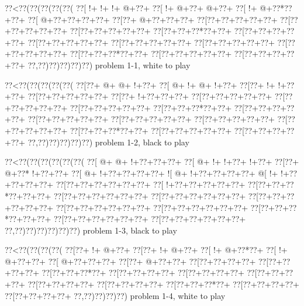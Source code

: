 \vbox{\vbox{\goo
\0??<\0??(\0??(\0??(\0??(\0??(
\0??[\- !+\- !+\- !+\- @+\0??+
\0??[\- !+\- @+\0??+\- @+\0??+
\0??[\- !+\- @+\0??*\0??+\0??+
\0??[\- @+\0??+\0??+\0??+\0??+
\0??[\0??+\- @+\0??+\0??+\0??+
\0??[\0??+\0??+\0??+\0??+\0??+
\0??[\0??+\0??+\0??+\0??+\0??+
\0??[\0??+\0??+\0??+\0??+\0??+
\0??[\0??+\0??+\0??*\0??+\0??+
\0??[\0??+\0??+\0??+\0??+\0??+
\0??[\0??+\0??+\0??+\0??+\0??+
\0??[\0??+\0??+\0??+\0??+\0??+
\0??[\0??+\0??+\0??+\0??+\0??+
\0??[\0??+\0??+\0??+\0??+\0??+
\0??[\0??+\0??+\0??*\0??+\0??+
\0??[\0??+\0??+\0??+\0??+\0??+
\0??[\0??+\0??+\0??+\0??+\0??+
\0??,\0??)\0??)\0??)\0??)\0??)
}
\hfil problem 1-1, white to play\hfil\break
}

\vbox{\vbox{\goo
\0??<\0??(\0??(\0??(\0??(\0??(
\0??[\0??+\- @+\- @+\- !+\0??+
\0??[\- @+\- !+\- @+\- !+\0??+
\0??[\0??+\- !+\- !+\0??+\0??+
\0??[\0??+\0??+\0??+\0??+\0??+
\0??[\0??+\- !+\0??+\0??+\0??+
\0??[\0??+\0??+\0??+\0??+\0??+
\0??[\0??+\0??+\0??+\0??+\0??+
\0??[\0??+\0??+\0??+\0??+\0??+
\0??[\0??+\0??+\0??*\0??+\0??+
\0??[\0??+\0??+\0??+\0??+\0??+
\0??[\0??+\0??+\0??+\0??+\0??+
\0??[\0??+\0??+\0??+\0??+\0??+
\0??[\0??+\0??+\0??+\0??+\0??+
\0??[\0??+\0??+\0??+\0??+\0??+
\0??[\0??+\0??+\0??*\0??+\0??+
\0??[\0??+\0??+\0??+\0??+\0??+
\0??[\0??+\0??+\0??+\0??+\0??+
\0??,\0??)\0??)\0??)\0??)\0??)
}
\hfil problem 1-2, black to play\hfil\break
}

\vbox{\vbox{\goo
\0??<\0??(\0??(\0??(\0??(\0??(\0??(
\0??[\- @+\- @+\- !+\0??+\0??+\0??+
\0??[\- @+\- !+\- !+\0??+\- !+\0??+
\0??[\0??+\- @+\0??*\- !+\0??+\0??+
\0??[\- @+\- !+\0??+\0??+\0??+\0??+
\- ![\- @+\- !+\0??+\0??+\0??+\0??+
\- @[\- !+\- !+\0??+\0??+\0??+\0??+
\0??[\0??+\0??+\0??+\0??+\0??+\0??+
\0??[\- !+\0??+\0??+\0??+\0??+\0??+
\0??[\0??+\0??+\0??*\0??+\0??+\0??+
\0??[\0??+\0??+\0??+\0??+\0??+\0??+
\0??[\0??+\0??+\0??+\0??+\0??+\0??+
\0??[\0??+\0??+\0??+\0??+\0??+\0??+
\0??[\0??+\0??+\0??+\0??+\0??+\0??+
\0??[\0??+\0??+\0??+\0??+\0??+\0??+
\0??[\0??+\0??+\0??*\0??+\0??+\0??+
\0??[\0??+\0??+\0??+\0??+\0??+\0??+
\0??[\0??+\0??+\0??+\0??+\0??+\0??+
\0??,\0??)\0??)\0??)\0??)\0??)\0??)
}
\hfil problem 1-3, black to play\hfil\break
}

\vbox{\vbox{\goo
\0??<\0??(\0??(\0??(\0??(
\0??[\0??+\- !+\- @+\0??+
\0??[\0??+\- !+\- @+\0??+
\0??[\- !+\- @+\0??*\0??+
\0??[\- !+\- @+\0??+\0??+
\0??[\- @+\0??+\0??+\0??+
\0??[\0??+\- @+\0??+\0??+
\0??[\0??+\0??+\0??+\0??+
\0??[\0??+\0??+\0??+\0??+
\0??[\0??+\0??+\0??*\0??+
\0??[\0??+\0??+\0??+\0??+
\0??[\0??+\0??+\0??+\0??+
\0??[\0??+\0??+\0??+\0??+
\0??[\0??+\0??+\0??+\0??+
\0??[\0??+\0??+\0??+\0??+
\0??[\0??+\0??+\0??*\0??+
\0??[\0??+\0??+\0??+\0??+
\0??[\0??+\0??+\0??+\0??+
\0??,\0??)\0??)\0??)\0??)
}
\hfil problem 1-4, white to play\hfil\break
}

